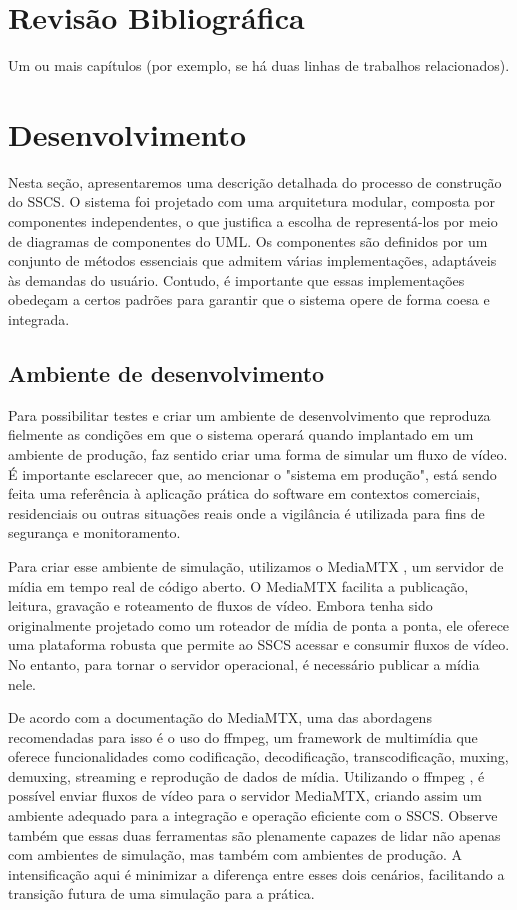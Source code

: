 \documentclass[12pt, %
openright, 
oneside, %
a4paper,    %
brazil]{facom-ufu-abntex2}
\begin{document}

\chapter{Revisão Bibliográfica}
Um ou mais capítulos (por exemplo, se há duas linhas de trabalhos
relacionados).

\chapter{Desenvolvimento}

Nesta seção, apresentaremos uma descrição detalhada do processo de construção
do SSCS. O sistema foi projetado com uma arquitetura modular, composta por
componentes independentes, o que justifica a escolha de representá-los por meio
de diagramas de componentes do UML. Os componentes são definidos por um
conjunto de métodos essenciais que admitem várias implementações, adaptáveis às
demandas do usuário. Contudo, é importante que essas implementações obedeçam a
certos padrões para garantir que o sistema opere de forma coesa e integrada.

\section{Ambiente de desenvolvimento}

Para possibilitar testes e criar um ambiente de desenvolvimento que reproduza
fielmente as condições em que o sistema operará quando implantado em um
ambiente de produção, faz sentido criar uma forma de simular um fluxo de vídeo.
É importante esclarecer que, ao mencionar o "sistema em produção", está sendo
feita uma referência à aplicação prática do software em contextos comerciais,
residenciais ou outras situações reais onde a vigilância é utilizada para fins
de segurança e monitoramento.

Para criar esse ambiente de simulação, utilizamos o MediaMTX \cite{mediamtx},
um servidor de mídia em tempo real de código aberto. O MediaMTX facilita a
publicação, leitura, gravação e roteamento de fluxos de vídeo. Embora tenha
sido originalmente projetado como um roteador de mídia de ponta a ponta, ele
oferece uma plataforma robusta que permite ao SSCS acessar e consumir fluxos de
vídeo. No entanto, para tornar o servidor operacional, é necessário publicar a
mídia nele.

De acordo com a documentação do MediaMTX, uma das abordagens recomendadas para
isso é o uso do ffmpeg, um framework de multimídia que oferece funcionalidades
como codificação, decodificação, transcodificação, muxing, demuxing, streaming
e reprodução de dados de mídia. Utilizando o ffmpeg \cite{ffmpeg}, é possível
enviar fluxos de vídeo para o servidor MediaMTX, criando assim um ambiente
adequado para a integração e operação eficiente com o SSCS. Observe também que
essas duas ferramentas são plenamente capazes de lidar não apenas com ambientes
de simulação, mas também com ambientes de produção. A intensificação aqui é
minimizar a diferença entre esses dois cenários, facilitando a transição futura
de uma simulação para a prática.
\end{document}
